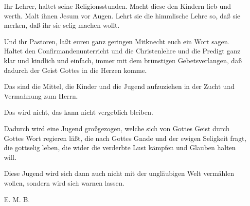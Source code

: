 Ihr Lehrer, haltet seine Religionsstunden. Macht diese den Kindern lieb und werth. Malt ihnen Jesum vor Augen. Lehrt sie die himmlische Lehre so, daß sie merken, daß ihr sie selig machen wollt.

Und ihr Pastoren, laßt euren ganz geringen Mitknecht euch ein Wort sagen. Haltet den Confirmandenunterricht und die Christenlehre und die Predigt ganz klar und kindlich und einfach, immer mit dem brünstigen Gebetsverlangen, daß dadurch der Geist Gottes in die Herzen komme.

Das sind die Mittel, die Kinder und die Jugend aufzuziehen in der Zucht und Vermahnung zum Herrn.

Das wird nicht, das kann nicht vergeblich bleiben.

Dadurch wird eine Jugend großgezogen, welche sich von Gottes Geist durch Gottes Wort regieren läßt, die nach Gottes Gnade und der ewigen Seligkeit fragt, die gottselig leben, die wider die verderbte Lust kämpfen und Glauben halten will.

Diese Jugend wird sich dann auch nicht mit der ungläubigen Welt vermählen wollen, sondern wird sich warnen lassen.

\begin{unterschrift}
E. M. B.
\end{unterschrift}
